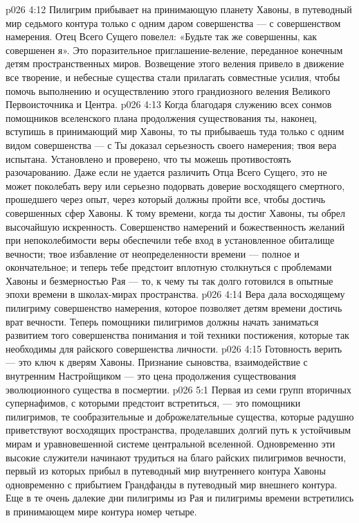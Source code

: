 \vs p026 4:12 Пилигрим прибывает на принимающую планету Хавоны, в путеводный мир седьмого контура только с одним даром совершенства --- с совершенством намерения. Отец Всего Сущего повелел: «Будьте так же совершенны, как совершенен я». Это поразительное приглашение\hyp{}веление, переданное конечным детям пространственных миров. Возвещение этого веления привело в движение все творение, и небесные существа стали прилагать совместные усилия, чтобы помочь выполнению и осуществлению этого грандиозного веления Великого Первоисточника и Центра.
\vs p026 4:13 Когда благодаря служению всех сонмов помощников вселенского плана продолжения существования ты, наконец, вступишь в принимающий мир Хавоны, то ты прибываешь туда только с одним видом совершенства --- с  Ты доказал серьезность своего намерения; твоя вера испытана. Установлено и проверено, что ты можешь противостоять разочарованию. Даже если не удается различить Отца Всего Сущего, это не может поколебать веру или серьезно подорвать доверие восходящего смертного, прошедшего через опыт, через который должны пройти все, чтобы достичь совершенных сфер Хавоны. К тому времени, когда ты достиг Хавоны, ты обрел высочайшую искренность. Совершенство намерений и божественность желаний при непоколебимости веры обеспечили тебе вход в установленное обиталище вечности; твое избавление от неопределенности времени --- полное и окончательное; и теперь тебе предстоит вплотную столкнуться с проблемами Хавоны и безмерностью Рая --- то, к чему ты так долго готовился в опытные эпохи времени в школах\hyp{}мирах пространства.
\vs p026 4:14 Вера дала восходящему пилигриму совершенство намерения, которое позволяет детям времени достичь врат вечности. Теперь помощники пилигримов должны начать заниматься развитием того совершенства понимания и той техники постижения, которые так необходимы для райского совершенства личности.
\vs p026 4:15  Готовность верить --- это ключ к дверям Хавоны. Признание сыновства, взаимодействие с внутренним Настройщиком --- это цена продолжения существования эволюционного существа в посмертии.
\vs p026 5:1 Первая из семи групп вторичных супернафимов, с которыми предстоит встретиться, --- это помощники пилигримов, те сообразительные и доброжелательные существа, которые радушно приветствуют восходящих пространства, проделавших долгий путь к устойчивым мирам и уравновешенной системе центральной вселенной. Одновременно эти высокие служители начинают трудиться на благо райских пилигримов вечности, первый из которых прибыл в путеводный мир внутреннего контура Хавоны одновременно с прибытием Грандфанды в путеводный мир внешнего контура. Еще в те очень далекие дни пилигримы из Рая и пилигримы времени встретились в принимающем мире контура номер четыре.
